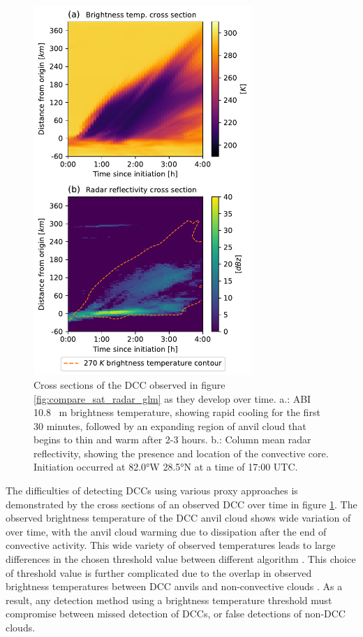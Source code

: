 \documentclass[amt, manuscript]{copernicus}
\begin{document}
\begin{figure}[t]
    \includegraphics[width=8.3cm]{figure02.pdf}
    \caption{Cross sections of the DCC observed in figure \ref{fig:compare_sat_radar_glm} as they develop over time. a.: ABI 10.8 \unit{\mu m} brightness temperature, showing rapid cooling for the first 30 minutes, followed by an expanding region of anvil cloud that begins to thin and warm after 2-3 hours. b.: Column mean radar reflectivity, showing the presence and location of the convective core. Initiation occurred at 82.0°W 28.5°N at a time of 17:00 UTC.}
    \label{fig:dcc_over_time}
\end{figure}

The difficulties of detecting DCCs using various proxy approaches is demonstrated by the cross sections of an observed DCC over time in figure \ref{fig:dcc_over_time}.
The observed brightness temperature of the DCC anvil cloud shows wide variation of over time, with the anvil cloud warming due to dissipation after the end of convective activity.
This wide variety of observed temperatures leads to large differences in the chosen threshold value between different algorithm \citep[see discussion in][]{bennartz_convective_2012}.
This choice of threshold value is further complicated due to the overlap in observed brightness temperatures between DCC anvils and non-convective clouds \citep{konduru_new_2013}.
As a result, any detection method using a brightness temperature threshold must compromise between missed detection of DCCs, or false detections of non-DCC clouds.
\end{document}
